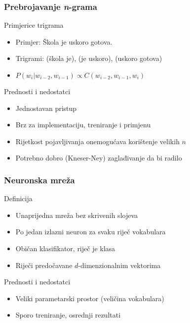 \documentclass[utf8]{beamer}
\begin{document}
\begin{frame}
\frametitle{Prebrojavanje \textit{n}-grama}

	\begin{block}{Primjerice trigrama}
	\begin{itemize}
		\item{Primjer: Škola je uskoro gotova.}
		\item{Trigrami: (škola je), (je uskoro), (uskoro gotova)}
		\item{$P(w_i | w_{i - 2}, w_{i - 1}) \propto C(w_{i - 2}, w_{i - 1}, w_i)$}
	\end{itemize}
	\end{block}

	\begin{block}{Prednosti i nedostatci}
	\begin{itemize}
		\item{Jednostavan pristup}
		\item{Brz za implementaciju, treniranje i primjenu}
		\item{Rijetkost pojavljivanja onemogućava korištenje velikih $n$}
		\item{Potrebno dobro (Kneser-Ney) zaglađivanje da bi radilo}
	\end{itemize}
	\end{block}

\end{frame}

\begin{frame}
\frametitle{Neuronska mreža}

	\begin{block}{Definicija}
	\begin{itemize}
		\item{Unaprijedna mreža bez skrivenih slojeva}
		\item{Po jedan izlazni neuron za svaku riječ vokabulara}
		\item{Običan klasifikator, riječ je klasa}
		\item{Riječi predočavane $d$-dimenzionalnim vektorima}
	\end{itemize}
	\end{block}

	\begin{block}{Prednosti i nedostatci}
	\begin{itemize}
		\item{Veliki parametarski prostor (veličina vokabulara)}
		\item{Sporo treniranje, osrednji rezultati}
	\end{itemize}
	\end{block}
\end{frame}
\end{document}
